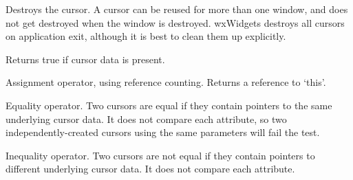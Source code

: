 \label{wxcursordtor}


Destroys the cursor. A cursor can be reused for more
than one window, and does not get destroyed when the window is
destroyed. wxWidgets destroys all cursors on application exit, although
it is best to clean them up explicitly.

\label{wxcursorisok}


Returns true if cursor data is present.

\label{wxcursorassignment}


Assignment operator, using reference counting. Returns a reference
to `this'.

\label{wxcursorequals}


Equality operator. Two cursors are equal if they contain pointers
to the same underlying cursor data. It does not compare each attribute,
so two independently-created cursors using the same parameters will
fail the test.

\label{wxcursornotequals}


Inequality operator. Two cursors are not equal if they contain pointers
to different underlying cursor data. It does not compare each attribute.


